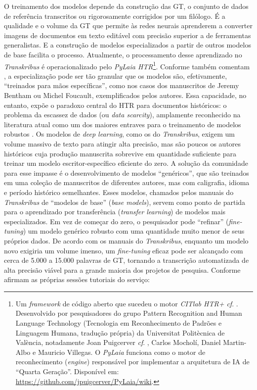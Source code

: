 \documentclass[portuguese]{textolivre}
\begin{document}
O treinamento dos modelos depende da construção das GT, o conjunto de dados de referência transcritos ou rigorosamente corrigidos por um filólogo. É a qualidade e o volume da GT que permite às redes neurais aprenderem a converter imagens de documentos em texto editável com precisão superior a de ferramentas generalistas. E a construção de modelos especializados a partir de outros modelos de base facilita o processo. Atualmente, o processamento desse aprendizado no \textit{Transkribus} é operacionalizado pelo \textit{PyLaia HTR}\footnote{Um \textit{framework} de código aberto que sucedeu o motor \textit{CITlab HTR+ cf}. \cite{terras2025artificial,nockels2022understanding}. Desenvolvido por pesquisadores do grupo Pattern Recognition and Human Language Technology (Tecnologia em Reconhecimento de Padrões e Linguagem Humana, tradução própria) da Universitat Politècnica de València, notadamente Joan Puigcerver \textit{cf}. \cite{puigcerver2017pylaia,puigcerver2018probabilistic}, Carlos Mocholí, Daniel Martin-Albo e Mauricio Villegas. O \textit{PyLaia} funciona como o motor de reconhecimento (\textit{engine}) responsável por implementar a arquitetura de IA de “Quarta Geração”. Disponível em: \url{https://github.com/jpuigcerver/PyLaia/wiki}.}. Conforme também comentam \textcite[p.~237]{baudry2023humanidades}, a especialização pode ser tão granular que os modelos são, efetivamente, “treinados para mãos específicas”, como nos casos dos manuscritos de Jeremy Bentham ou Michel Foucault, exemplificados pelos autores. Essa capacidade, no entanto, expõe o paradoxo central do HTR para documentos históricos: o problema da escassez de dados (ou \textit{data scarcity}), amplamente reconhecido na literatura atual como um dos maiores entraves para o treinamento de modelos robustos \cite{alkendi2024advancements}. Os modelos de \textit{deep learning}, como os do \textit{Transkribus}, exigem um volume massivo de texto para atingir alta precisão, mas são poucos os autores históricos cuja produção manuscrita sobrevive em quantidade suficiente para treinar um modelo escritor-específico eficiente do zero. A solução da comunidade para esse impasse é o desenvolvimento de modelos “genéricos”, que são treinados em uma coleção de manuscritos de diferentes autores, mas com caligrafia, idioma e período histórico semelhantes. Esses modelos, chamados pelos manuais do \textit{Transkribus} de “modelos de base” (\textit{base models}), servem como ponto de partida para o aprendizado por transferência (\textit{transfer learning}) de modelos mais especializados. Em vez de começar do zero, o pesquisador pode “refinar” (\textit{fine-tuning}) um modelo genérico robusto com uma quantidade muito menor de seus próprios dados. De acordo com os manuais do \textit{Transkribus}, enquanto um modelo novo exigiria um volume imenso, um \textit{fine-tuning} eficaz pode ser alcançado com cerca de 5.000 a 15.000 palavras de GT, tornando a transcrição automatizada de alta precisão viável para a grande maioria dos projetos de pesquisa. Conforme afirmam as próprias sessões tutoriais do serviço:
\end{document}
